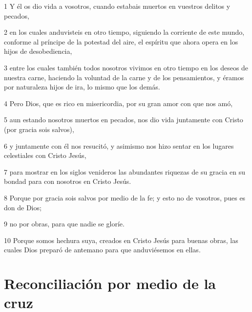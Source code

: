 \par 1 Y él os dio vida a vosotros, cuando estabais muertos en vuestros delitos y pecados,
\par 2 en los cuales anduvisteis en otro tiempo, siguiendo la corriente de este mundo, conforme al príncipe de la potestad del aire, el espíritu que ahora opera en los hijos de desobediencia,
\par 3 entre los cuales también todos nosotros vivimos en otro tiempo en los deseos de nuestra carne, haciendo la voluntad de la carne y de los pensamientos, y éramos por naturaleza hijos de ira, lo mismo que los demás.
\par 4 Pero Dios, que es rico en misericordia, por su gran amor con que nos amó,
\par 5 aun estando nosotros muertos en pecados, nos dio vida juntamente con Cristo (por gracia sois salvos),
\par 6 y juntamente con él nos resucitó, y asimismo nos hizo sentar en los lugares celestiales con Cristo Jesús,
\par 7 para mostrar en los siglos venideros las abundantes riquezas de su gracia en su bondad para con nosotros en Cristo Jesús.
\par 8 Porque por gracia sois salvos por medio de la fe; y esto no de vosotros, pues es don de Dios;
\par 9 no por obras, para que nadie se gloríe.
\par 10 Porque somos hechura suya, creados en Cristo Jesús para buenas obras, las cuales Dios preparó de antemano para que anduviésemos en ellas.

\section*{Reconciliación por medio de la cruz}

